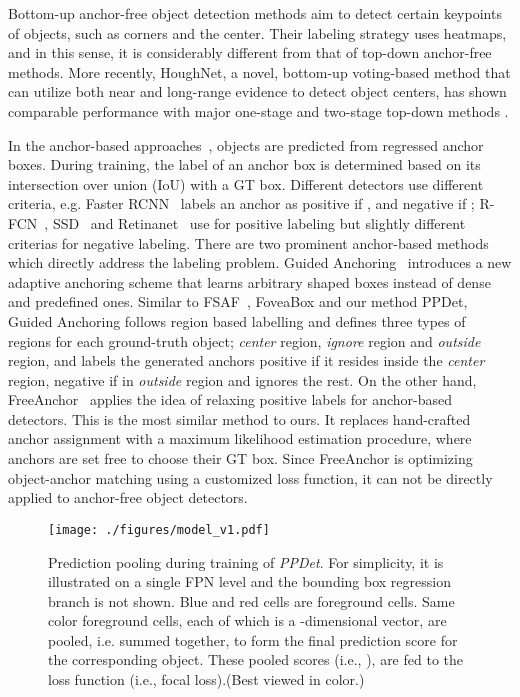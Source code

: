 \documentclass{bmvc2k}
\begin{document}
Bottom-up anchor-free object detection methods \cite{cornernet, extremenet, centernet, triplet} aim to detect certain keypoints of objects, such as corners and the center. Their labeling strategy uses heatmaps, and in this sense, it is considerably different from that of top-down anchor-free methods. More recently, HoughNet, a novel, bottom-up voting-based method that can utilize both near and long-range evidence to detect object centers, has shown comparable performance with major one-stage and two-stage top-down methods \cite{houghnet}. 


In the anchor-based approaches~\cite{faster, rfcn, ssd, yolo3, retinanet, freeanchor, guided}, objects are predicted from regressed anchor boxes. During training, the label of an anchor box is determined  based on its  intersection over union (IoU) with a GT box. Different detectors use different criteria, e.g. Faster RCNN~\cite{faster} labels an anchor as positive if , and negative if ; R-FCN~\cite{rfcn}, SSD~\cite{ssd} and Retinanet~\cite{retinanet} use  for positive labeling but slightly different criterias for negative labeling. There are two prominent anchor-based methods which directly address the labeling problem.  Guided Anchoring~\cite{guided} introduces a new adaptive anchoring scheme that  learns arbitrary shaped boxes instead of dense and predefined ones. Similar to FSAF~\cite{fsaf}, FoveaBox \cite{foveabox} and our method PPDet,  Guided Anchoring follows region based labelling and defines three types of regions for each ground-truth object; \textit{center} region, \textit{ignore} region and \textit{outside} region, and labels the generated anchors positive if it resides inside the \textit{center} region, negative if in \textit{outside} region and ignores the rest. On the other hand, FreeAnchor~\cite{freeanchor} applies the idea of relaxing positive labels for anchor-based detectors. This is the most similar method to ours.  It replaces hand-crafted anchor assignment with a maximum likelihood estimation procedure, where anchors are set free to choose their  GT box. Since FreeAnchor is optimizing object-anchor matching using a customized loss function, it can not be directly applied to anchor-free object detectors. 









\begin{figure}\centering
      \texttt{[image: ./figures/model\_v1.pdf]} 
  \caption{Prediction pooling during training of  \textit{PPDet}. For simplicity, it is illustrated on a single FPN level and the bounding box regression branch is not shown. Blue and red cells are foreground cells. Same color foreground cells, each of which is a -dimensional vector, are pooled, i.e. summed  together, to form the final prediction score for the corresponding object. These pooled scores (i.e., ), are fed to the loss function (i.e., focal loss).(Best viewed in color.)
}
\label{fig:modelv1} 
\end{figure}
\end{document}
